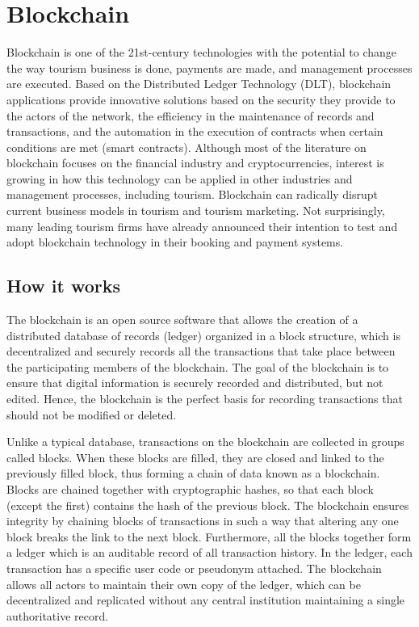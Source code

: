 \documentclass[
  letterpaper,
  DIV=11,
  numbers=noendperiod]{scrreprt}
\begin{document}
\hypertarget{blockchain}{%
\section{Blockchain}\label{blockchain}}

Blockchain is one of the 21st-century technologies with the potential to
change the way tourism business is done, payments are made, and
management processes are executed. Based on the Distributed Ledger
Technology (DLT), blockchain applications provide innovative solutions
based on the security they provide to the actors of the network, the
efficiency in the maintenance of records and transactions, and the
automation in the execution of contracts when certain conditions are met
(smart contracts). Although most of the literature on blockchain focuses
on the financial industry and cryptocurrencies, interest is growing in
how this technology can be applied in other industries and management
processes, including tourism. Blockchain can radically disrupt current
business models in tourism and tourism marketing. Not surprisingly, many
leading tourism firms have already announced their intention to test and
adopt blockchain technology in their booking and payment systems.

\hypertarget{how-it-works}{%
\subsection{How it works}\label{how-it-works}}

The blockchain is an open source software that allows the creation of a
distributed database of records (ledger) organized in a block structure,
which is decentralized and securely records all the transactions that
take place between the participating members of the blockchain. The goal
of the blockchain is to ensure that digital information is securely
recorded and distributed, but not edited. Hence, the blockchain is the
perfect basis for recording transactions that should not be modified or
deleted.

Unlike a typical database, transactions on the blockchain are collected
in groups called blocks. When these blocks are filled, they are closed
and linked to the previously filled block, thus forming a chain of data
known as a blockchain. Blocks are chained together with cryptographic
hashes, so that each block (except the first) contains the hash of the
previous block. The blockchain ensures integrity by chaining blocks of
transactions in such a way that altering any one block breaks the link
to the next block. Furthermore, all the blocks together form a ledger
which is an auditable record of all transaction history. In the ledger,
each transaction has a specific user code or pseudonym attached. The
blockchain allows all actors to maintain their own copy of the ledger,
which can be decentralized and replicated without any central
institution maintaining a single authoritative record.
\end{document}
